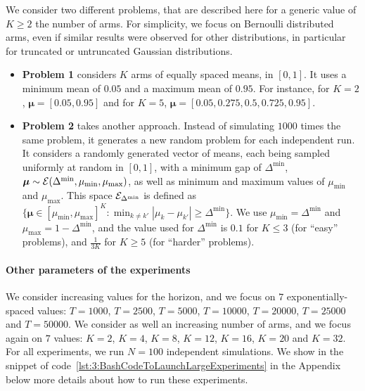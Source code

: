 We consider two different problems, that are described here for a generic value of $K \geq 2$ the number of arms.
For simplicity, we focus on Bernoulli distributed arms, even if similar results were observed for other distributions, in particular for truncated or untruncated Gaussian distributions.

\begin{itemize}
    \item \textbf{Problem 1} considers $K$ arms of equally spaced means, in $[0,1]$.
    It uses a minimum mean of $0.05$ and a maximum mean of $0.95$.
    For instance, for $K=2$, $\bm{\mu}=[0.05, 0.95]$ and for $K=5$, $\bm{\mu} = [0.05, 0.275, 0.5, 0.725, 0.95]$.

    \item \textbf{Problem 2} takes another approach. Instead of simulating $1000$ times the same problem, it generates a new random problem for each independent run.
    It considers a randomly generated vector of means, each being sampled uniformly at random in $[0,1]$, with a minimum gap of $\Delta^{\min}$, $\bm{\mu} \sim \mathcal{E}(\Delta^{\min},\mu_{\min},\mu_{\max})$, as well as minimum and maximum values of $\mu_{\min}$ and $\mu_{\max}$.
    This space $\mathcal{E}_{\Delta^{\min}}$ is defined as $\{ \bm{\mu} \in [\mu_{\min}, \mu_{\max}]^K : \min_{k\neq k'} |\mu_k - \mu_{k'}| \geq \Delta^{\min} \}$.
    We use $\mu_{\min} = \Delta^{\min}$ and $\mu_{\max} = 1 - \Delta^{\min}$,
    and the value used for $\Delta^{\min}$ is $0.1$ for $K \leq 3$ (for ``easy'' problems), and $\frac{1}{3 K}$ for $K \geq 5$ (for ``harder'' problems).
\end{itemize}


\paragraph{Other parameters of the experiments}

We consider increasing values for the horizon, and we focus on $7$ exponentially-spaced values: $T=1000$, $T=2500$, $T=5000$, $T=10000$, $T=20000$, $T=25000$ and $T=50000$.
We consider as well an increasing number of arms, and we focus again on $7$ values: $K=2$, $K=4$, $K=8$, $K=12$, $K=16$, $K=20$ and $K=32$.
For all experiments, we run $N=100$ independent simulations.
We show in the snippet of code~\ref{lst:3:BashCodeToLaunchLargeExperiments} in the Appendix below more details about how to run these experiments.



